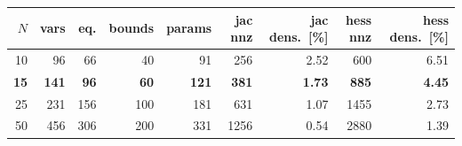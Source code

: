 \begin{tabular}{rrrrrrrrr}
  \toprule
  $N$ & vars & eq. & bounds & params & jac nnz & jac dens.\ [\%] & hess nnz & hess dens.\ [\%] \\
  \midrule
  10 & 96 & 66 & 40 & 91 & 256 & 2.52 & 600 & 6.51 \\
  \textbf{15} & \textbf{141} & \textbf{96} & \textbf{60} & \textbf{121} & \textbf{381} & \textbf{1.73} & \textbf{885} & \textbf{4.45} \\
  25 & 231 & 156 & 100 & 181 & 631 & 1.07 & 1455 & 2.73 \\
  50 & 456 & 306 & 200 & 331 & 1256 & 0.54 & 2880 & 1.39 \\
  \bottomrule
\end{tabular}
